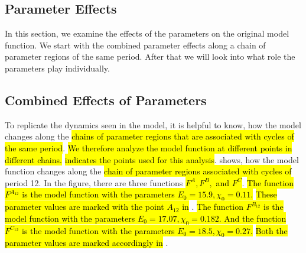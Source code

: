 \subsection{Parameter Effects}
\label{sec:setup.char.paramfx}

In this section, we examine the effects of the parameters on the original model function.
We start with the combined parameter effects along a chain of parameter regions of the same period.
After that we will look into what role the parameters play individually.

\subsection{Combined Effects of Parameters}
\label{sec:setup.char.paramfx.combined}

To replicate the dynamics seen in the model, it is helpful to know, how the model changes along the \hl{chains of parameter regions that are associated with cycles of the same period}.
\hl{
	We therefore analyze the model function at different points in different chains.
}
 \hl{indicates the points used for this analysis}.
 shows, how the model function changes along the \hl{chain of parameter regions associated with cycles of} period 12.
In the figure, there are three functions \hl{$F^A, F^B,$ and $F^C$}.
\hl{
	The function $F^{A_{12}}$ is the model function with the parameters $E_0 = 15.9, \chi_0 = 0.11$.
}
\hl{These parameter values are marked with the point $A_{12}$ in} .
\hl{
	The function $F^{B_{12}}$ is the model function with the parameters $E_0 = 17.07, \chi_0 = 0.182$.
	And the function $F^{C_{12}}$ is the model function with the parameters $E_0 = 18.5, \chi_0 = 0.27$.
}
\hl{Both the parameter values are marked accordingly in} .

